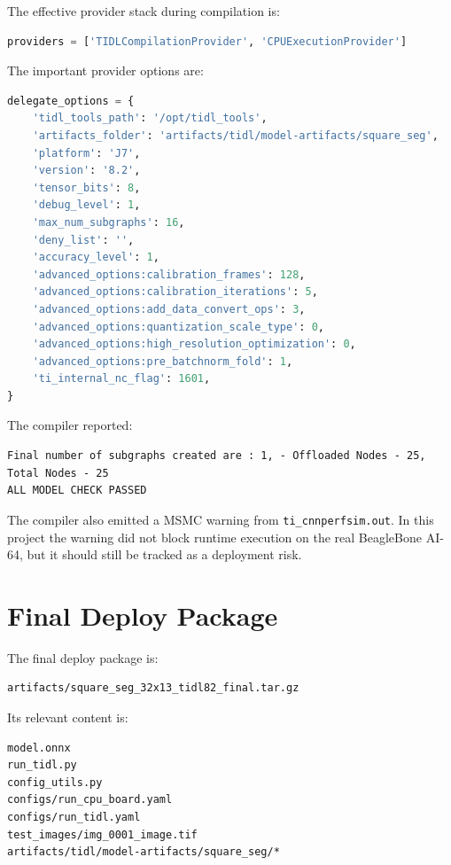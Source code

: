 \documentclass[11pt,a4paper]{article}
\begin{document}
The effective provider stack during compilation is:

\begin{lstlisting}[language=Python]
providers = ['TIDLCompilationProvider', 'CPUExecutionProvider']
\end{lstlisting}

The important provider options are:

\begin{lstlisting}[language=Python]
delegate_options = {
    'tidl_tools_path': '/opt/tidl_tools',
    'artifacts_folder': 'artifacts/tidl/model-artifacts/square_seg',
    'platform': 'J7',
    'version': '8.2',
    'tensor_bits': 8,
    'debug_level': 1,
    'max_num_subgraphs': 16,
    'deny_list': '',
    'accuracy_level': 1,
    'advanced_options:calibration_frames': 128,
    'advanced_options:calibration_iterations': 5,
    'advanced_options:add_data_convert_ops': 3,
    'advanced_options:quantization_scale_type': 0,
    'advanced_options:high_resolution_optimization': 0,
    'advanced_options:pre_batchnorm_fold': 1,
    'ti_internal_nc_flag': 1601,
}
\end{lstlisting}

The compiler reported:

\begin{lstlisting}
Final number of subgraphs created are : 1, - Offloaded Nodes - 25, Total Nodes - 25
ALL MODEL CHECK PASSED
\end{lstlisting}

The compiler also emitted a MSMC warning from \texttt{ti\_cnnperfsim.out}.  In this project the warning did not block runtime execution on the real BeagleBone AI-64, but it should still be tracked as a deployment risk.

\section{Final Deploy Package}

The final deploy package is:

\begin{lstlisting}
artifacts/square_seg_32x13_tidl82_final.tar.gz
\end{lstlisting}

Its relevant content is:

\begin{lstlisting}
model.onnx
run_tidl.py
config_utils.py
configs/run_cpu_board.yaml
configs/run_tidl.yaml
test_images/img_0001_image.tif
artifacts/tidl/model-artifacts/square_seg/*
\end{lstlisting}
\end{document}
